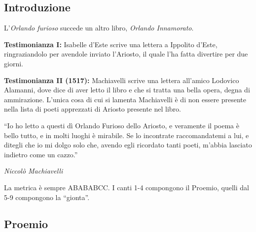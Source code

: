 \documentclass[a4paper]{article}
\newcommand{\quotes}[1]{``#1''}
\begin{document}
\subsection{Introduzione}

L'\textit{Orlando furioso} succede un altro libro,
\textit{Orlando Innamorato}.

\textbf{Testimonianza I:} Isabelle d'Este scrive una lettera a Ippolito d'Este,
ringraziandolo per avendole inviato l'Ariosto, il quale l'ha fatta
divertire per due giorni.

\textbf{Testimonianza II (1517):}  Machiavelli scrive una lettera all'amico
Lodovico Alamanni, dove dice di aver letto il libro e
che si tratta una bella opera, degna di ammirazione.
L'unica cosa di cui si lamenta Machiavelli è di non essere presente nella lista di
poeti apprezzati di Ariosto presente nel libro.

\epigraph{\quotes{Io ho letto a questi dì Orlando Furioso dello Ariosto, e veramente il poema è bello tutto, e in molti luoghi è mirabile. Se lo incontrate raccomandatemi a lui, e ditegli che io mi dolgo solo che, avendo egli ricordato tanti poeti, m'abbia lasciato indietro come un cazzo.}}
{\textit{Niccolò Machiavelli}}


La metrica è sempre ABABABCC.
I canti 1-4 compongono il Proemio, quelli dal 5-9 compongono la \quotes{gionta}.

\pagebreak

\subsection{Proemio}


\begin{center}
\begin{minipage}{0.5\textwidth}
\centering
{}
\end{minipage}
\end{center}
\end{document}
